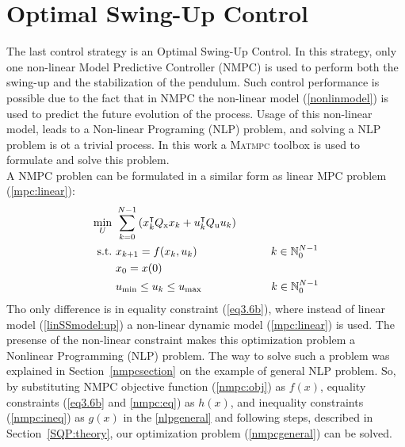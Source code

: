 \section{Optimal Swing-Up Control}
The last control strategy is an Optimal Swing-Up Control. In this strategy, only one non-linear Model Predictive Controller (NMPC) is used to perform both the swing-up and the stabilization of the pendulum. Such control performance is possible due to the fact that in NMPC the non-linear model (\ref{nonlinmodel}) is used to predict the future evolution of the process.  Usage of this non-linear model, leads to a Non-linear Programing (NLP) problem, and solving a NLP problem is ot a trivial process. In this work a \textsc{Matmpc} toolbox is used \cite{Matmpc} to formulate and solve this problem.\\

A NMPC problen can be formulated in a similar form as linear MPC problem (\ref{mpc:linear}):
\begin{subequations}\label{nmpcgeneral}
	\begin{align}
	\min_{U}\ &\sum_{k=0}^{N-1} \left(  x_{k}^\intercal Q _{\text{x}}x_{k}+u_{k}^\intercal Q _{\text{u}}u_{k} \right)\label{nmpc:obj}\\
\text{s.t.}\ &x_{k+1} = f(x_{k}, u_{k})\qquad\qquad\qquad \ \   k \in \mathbb{N}_0^{N-1}\label{eq3.6b}\\
&x_0 = x(0)\label{nmpc:eq}\\
&u _{\text{min}}\leq u_{k}\leq u _{\text{max}}\qquad\qquad\qquad\;   k \in \mathbb{N}_0^{N-1}\label{nmpc:ineq}
	\end{align}
\end{subequations}
Tho only difference is in equality constraint (\ref{eq3.6b}), where instead of linear model (\ref{linSSmodel:up}) a non-linear dynamic model (\ref{mpc:linear}) is used. The presense of the non-linear constraint makes this optimization problem a Nonlinear Programming (NLP) problem. The way to solve such a problem was explained in Section~\ref{nmpcsection} on the example of general NLP problem. So, by substituting NMPC objective function (\ref{nmpc:obj}) as $f(x)$, equality constraints (\ref{eq3.6b} and \ref{nmpc:eq}) as $h(x)$, and inequality constraints (\ref{nmpc:ineq}) as $g(x)$ in the \ref{nlpgeneral} and following steps, described in Section~\ref{SQP:theory}, our optimization problem (\ref{nmpcgeneral}) can be solved.\\

